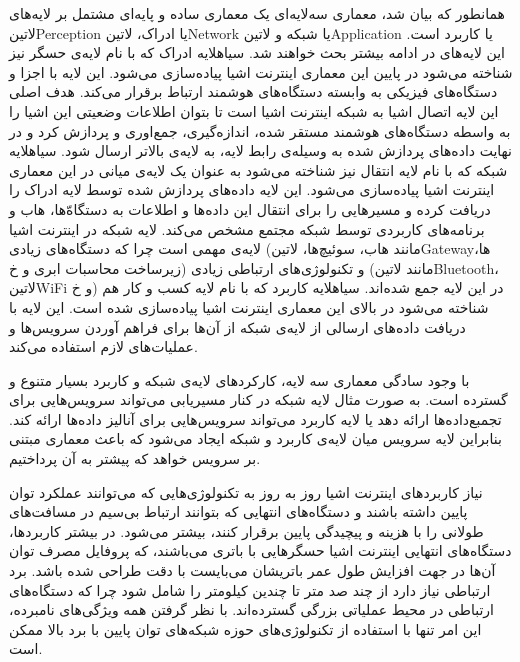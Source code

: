 همانطور که بیان شد، معماری سه‌لایه‌ای یک معماری ساده و پایه‌ای مشتمل بر لایه‌های ‌لاتین{Perception} یا ادراک، ‌لاتین{Network} یا شبکه و ‌لاتین{Application} یا کاربرد است.
این لایه‌های در ادامه بیشتر بحث خواهند شد.
 ‌سیاه{لایه ادراک} که با نام لایه‌ی حسگر نیز شناخته می‌شود در پایین این معماری اینترنت اشیا پیاده‌سازی می‌شود. این لایه با اجزا و دستگاه‌های فیزیکی به وابسته دستگاه‌های هوشمند ارتباط برقرار می‌کند.
هدف اصلی این لایه اتصال اشیا به شبکه اینترنت اشیا است تا بتوان اطلاعات وضعیتی این اشیا را به واسطه دستگاه‌های هوشمند مستقر شده، اندازه‌گیری، جمع‌اوری و پردازش کرد و در نهایت داده‌های پردازش شده به
وسیله‌ی رابط لایه، به لایه‌ی بالاتر ارسال شود.
 ‌سیاه{لایه شبکه} که با نام لایه انتقال نیز شناخته می‌شود به عنوان یک لایه‌ی میانی در این معماری اینترنت اشیا پیاده‌سازی می‌شود. این لایه داده‌های پردازش شده توسط لایه ادراک را دریافت کرده و
مسیرهایی را برای انتقال این داده‌ها و اطلاعات به دستگاه‌ّها، هاب و برنامه‌های کاربردی توسط شبکه مجتمع مشخص می‌کند. لایه شبکه در اینترنت اشیا لایه‌ی مهمی است چرا که دستگاه‌های زیادی (مانند
هاب، سوئیچ‌ها، ‌لاتین{Gateway}ها، زیرساخت محاسبات ابری و ‌خ) و تکنولوژی‌های ارتباطی زیادی (مانند ‌لاتین{Bluetooth}، ‌لاتین{WiFi} و ‌خ) در این لایه جمع شده‌اند.
 ‌سیاه{لایه کاربرد} که با نام لایه کسب و کار هم شناخته می‌شود در بالای این معماری اینترنت اشیا پیاده‌سازی شده است. این لایه با دریافت داده‌های ارسالی از لایه‌ی شبکه از آن‌ها برای فراهم آوردن
سرویس‌ها و عملیات‌های لازم استفاده می‌کند.

با وجود سادگی معماری سه لایه، کارکردهای لایه‌ی شبکه و کاربرد بسیار متنوع و گسترده است. به صورت مثال لایه شبکه در کنار مسیریابی می‌تواند سرویس‌هایی برای تجمبع‌داده‌ها ارائه دهد یا لایه کاربرد
می‌تواند سرویس‌هایی برای آنالیز داده‌ها ارائه کند. بنابراین لایه سرویس میان لایه‌ی کاربرد و شبکه ایجاد می‌شود که باعث معماری مبتنی بر سرویس خواهد که پیشتر به آن پرداختیم.


نیاز کاربردهای اینترنت اشیا روز به روز به تکنولوژی‌هایی که می‌توانند عملکرد توان پایین داشته باشند
و دستگاه‌های انتهایی که بتوانند ارتباط بی‌سیم در مسافت‌های طولانی را با هزینه و پیچیدگی پایین برقرار کنند، بیشتر می‌شود.
در بیشتر کاربردها، دستگاه‌های انتهایی اینترنت اشیا حسگرهایی با باتری می‌باشند، که پروفایل مصرف توان آن‌ها در جهت افزایش طول عمر
باتریشان می‌بایست با دقت طراحی شده باشد.
برد ارتباطی نیاز دارد از چند صد متر تا چندین کیلومتر را شامل شود چرا که دستگاه‌های ارتباطی در محیط عملیاتی بزرگی گسترده‌اند.
با نظر گرفتن همه ویژگی‌های نامبرده، این امر تنها با استفاده از تکنولوژی‌های حوزه شبکه‌های توان پایین با برد بالا ممکن است.

